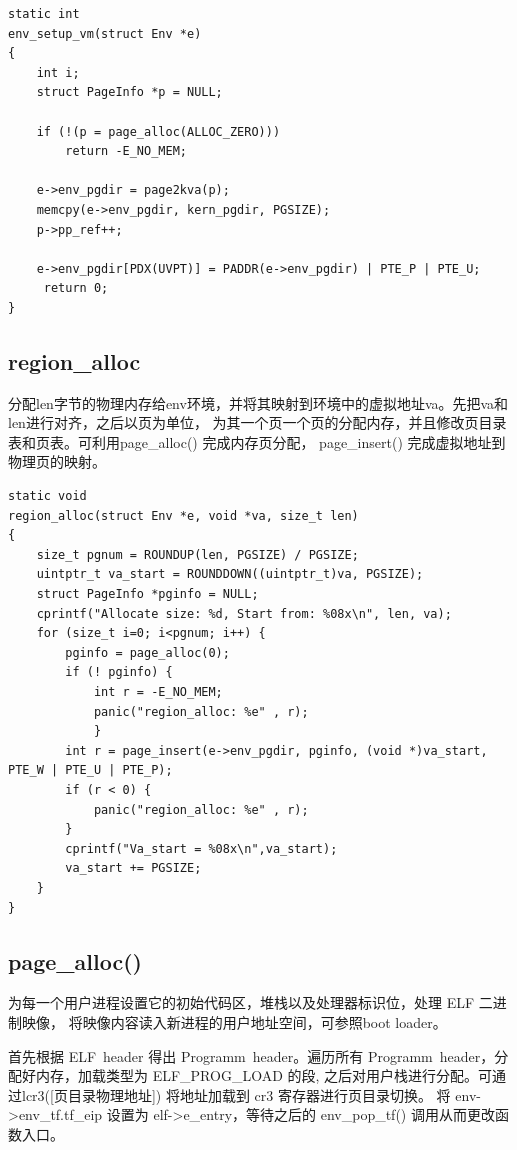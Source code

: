 \documentclass[12pt,a4paper,UTF8]{article}
\begin{document}
    \begin{lstlisting}[style=CPP]
static int
env_setup_vm(struct Env *e)
{
    int i;
    struct PageInfo *p = NULL;
  
    if (!(p = page_alloc(ALLOC_ZERO)))
        return -E_NO_MEM;
    
    e->env_pgdir = page2kva(p);
    memcpy(e->env_pgdir, kern_pgdir, PGSIZE);
    p->pp_ref++;

    e->env_pgdir[PDX(UVPT)] = PADDR(e->env_pgdir) | PTE_P | PTE_U;
     return 0;
}
    \end{lstlisting}

    \subsection{region\_alloc}
    分配len字节的物理内存给env环境，并将其映射到环境中的虚拟地址va。先把va和len进行对齐，之后以页为单位，
    为其一个页一个页的分配内存，并且修改页目录表和页表。可利用page\_alloc() 完成内存页分配，
    page\_insert() 完成虚拟地址到物理页的映射。

    \begin{lstlisting}[style=CPP]
static void
region_alloc(struct Env *e, void *va, size_t len)
{
    size_t pgnum = ROUNDUP(len, PGSIZE) / PGSIZE;
    uintptr_t va_start = ROUNDDOWN((uintptr_t)va, PGSIZE);
    struct PageInfo *pginfo = NULL;
    cprintf("Allocate size: %d, Start from: %08x\n", len, va);
    for (size_t i=0; i<pgnum; i++) {
        pginfo = page_alloc(0);
        if (! pginfo) {
            int r = -E_NO_MEM;
            panic("region_alloc: %e" , r);
            }
        int r = page_insert(e->env_pgdir, pginfo, (void *)va_start, PTE_W | PTE_U | PTE_P);
        if (r < 0) {
            panic("region_alloc: %e" , r);
        }
        cprintf("Va_start = %08x\n",va_start);
        va_start += PGSIZE;
    } 
}
    \end{lstlisting}

    \subsection{page\_alloc()}

    为每一个用户进程设置它的初始代码区，堆栈以及处理器标识位，处理 ELF 二进制映像，
    将映像内容读入新进程的用户地址空间，可参照boot loader。

    首先根据 ELF\ header 得出 Programm\ header。遍历所有 Programm\ header，分配好内存，加载类型为 ELF\_PROG\_LOAD 的段,
    之后对用户栈进行分配。可通过lcr3([页目录物理地址]) 将地址加载到 cr3 寄存器进行页目录切换。
    将 env->env\_tf.tf\_eip 设置为 elf->e\_entry，等待之后的 env\_pop\_tf() 调用从而更改函数入口。
\end{document}
